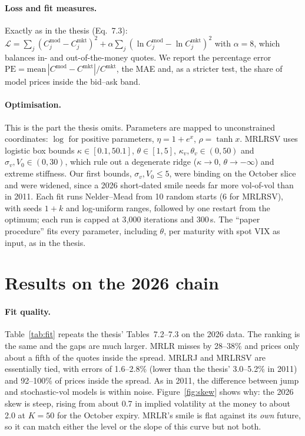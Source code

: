 \documentclass[10pt,twocolumn]{article}
\begin{document}
\paragraph{Loss and fit measures.} Exactly as in the thesis (Eq.~7.3):
$\mathcal L=\sum_j(C^\text{mod}_j-C^\text{mkt}_j)^2+\alpha\sum_j(\ln C^\text{mod}_j-\ln C^\text{mkt}_j)^2$
with $\alpha=8$, which balances in- and out-of-the-money quotes. We report the
percentage error $\text{PE}=\text{mean}\,|C^\text{mod}-C^\text{mkt}|/C^\text{mkt}$, the
MAE and, as a stricter test, the share of model prices inside the bid--ask band.

\paragraph{Optimisation.} This is the part the thesis omits.
Parameters are mapped to unconstrained coordinates: $\log$ for positive parameters,
$\eta=1+e^x$, $\rho=\tanh x$. MRLRSV uses logistic box bounds
$\kappa\in[0.1,50.1]$, $\theta\in[1,5]$, $\kappa_v,\theta_v\in(0,50)$ and
$\sigma_v,V_0\in(0,30)$, which rule out a degenerate ridge ($\kappa\to0$,
$\theta\to-\infty$) and extreme stiffness. Our first bounds, $\sigma_v,V_0\le5$, were
binding on the October slice and were widened, since a 2026 short-dated smile needs
far more vol-of-vol than in 2011. Each fit runs Nelder--Mead from 10 random starts
(6 for MRLRSV), with seeds $1+k$ and log-uniform ranges, followed by one restart from
the optimum; each run is capped at 3{,}000 iterations and 300\,s. The ``paper
procedure'' fits every parameter, including $\theta$, per maturity with spot VIX
as input, as in the thesis.

\section{Results on the 2026 chain}

\paragraph{Fit quality.} Table~\ref{tab:fit} repeats the thesis' Tables~7.2--7.3 on the
2026 data. The ranking is the same and the gaps are much larger. MRLR misses by
28--38\% and prices only about a fifth of the quotes inside the spread. MRLRJ and
MRLRSV are essentially tied, with errors of 1.6--2.8\% (lower than the thesis'
3.0--5.2\% in 2011) and 92--100\% of prices inside the spread. As in 2011, the
difference between jump and stochastic-vol models is within noise.
Figure~\ref{fig:skew} shows why: the 2026 skew is steep, rising from about 0.7 in implied volatility at the money to about 2.0 at $K=50$ for the
October expiry.
MRLR's smile is flat against its \emph{own} future, so it can match either the
level or the slope of this curve but not both.
\end{document}
